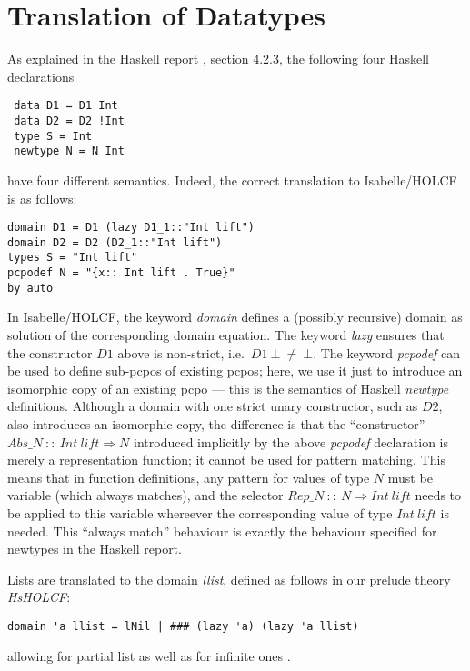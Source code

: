\documentclass{llncs}
\begin{document}
\section{Translation of Datatypes}

As explained in the Haskell report \cite{HaskellRep}, section 4.2.3,
the following four Haskell declarations

\begin{verbatim}
 data D1 = D1 Int
 data D2 = D2 !Int
 type S = Int
 newtype N = N Int
\end{verbatim}

have four different semantics. Indeed, the correct translation to
Isabelle/HOLCF is as follows:

\begin{verbatim}
domain D1 = D1 (lazy D1_1::"Int lift")
domain D2 = D2 (D2_1::"Int lift")
types S = "Int lift"
pcpodef N = "{x:: Int lift . True}"
by auto
\end{verbatim}
\noindent In Isabelle/HOLCF, the keyword \emph{domain} defines a
(possibly recursive) domain as solution of the corresponding domain
equation.  The keyword \emph{lazy} ensures that the constructor $D1$
above is non-strict, i.e.\ $D1 \ \bot \ \neq \ \bot$.  The keyword
\emph{pcpodef} can be used to define sub-pcpos of existing pcpos;
here, we use it just to introduce an isomorphic copy of an existing
pcpo --- this is the semantics of Haskell \emph{newtype} definitions.
Although a domain with one strict unary constructor, such as $D2$,
also introduces an isomorphic copy, the difference is that the
``constructor'' $Abs\_N~ ::~ Int~ \mathit{lift} \Rightarrow N$
introduced implicitly by the above \emph{pcpodef} declaration is
merely a representation function; it cannot be used for pattern
matching. This means that in function definitions, any pattern for
values of type $N$ must be variable (which always matches), and the
selector $Rep\_N~ ::~ N \Rightarrow Int ~ \mathit{lift}$ needs to be
applied to this variable whereever the corresponding value of type
$Int ~ \mathit{lift}$ is needed. This ``always match'' behaviour is
exactly the behaviour specified for newtypes in the Haskell report.

Lists are translated to the domain \emph{llist}, defined as follows 
in our prelude theory \emph{HsHOLCF}:

\begin{verbatim}
domain 'a llist = lNil | ### (lazy 'a) (lazy 'a llist) 
\end{verbatim}
\noindent allowing for partial list as well as for infinite ones \cite{holcf}.\\
\end{document}
